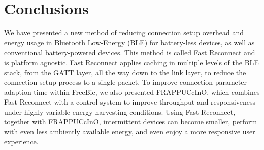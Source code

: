\chapter{Conclusions}
\label{chp:conclusions}

We have presented a new method of reducing connection setup overhead and energy usage in Bluetooth Low-Energy (BLE) for battery-less devices, as well as conventional battery-powered devices. This method is called Fast Reconnect and is platform agnostic. Fast Reconnect applies caching in multiple levels of the BLE stack, from the GATT layer, all the way down to the link layer, to reduce the connection setup process to a single packet. To improve connection parameter adaption time within FreeBie, we also presented FRAPPUCcInO, which combines Fast Reconnect with a control system to improve throughput and responsiveness under highly variable energy harvesting conditions. Using Fast Reconnect, together with FRAPPUCcInO, intermittent devices can become smaller, perform with even less ambiently available energy, and even enjoy a more responsive user experience.